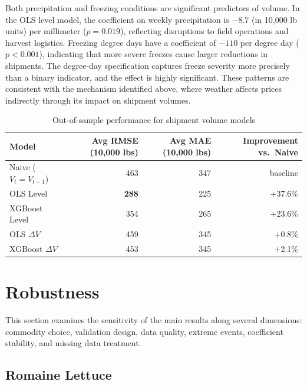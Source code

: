 \documentclass[12pt]{article}
\begin{document}
Both precipitation and freezing conditions are significant predictors of volume. In the OLS level model, the coefficient on weekly precipitation is $-8.7$ (in 10,000 lb units) per millimeter ($p = 0.019$), reflecting disruptions to field operations and harvest logistics. Freezing degree days have a coefficient of $-110$ per degree day ($p < 0.001$), indicating that more severe freezes cause larger reductions in shipments. The degree-day specification captures freeze severity more precisely than a binary indicator, and the effect is highly significant. These patterns are consistent with the mechanism identified above, where weather affects prices indirectly through its impact on shipment volumes.

\begin{table}[!htbp]
\centering
\caption{Out-of-sample performance for shipment volume models}
\label{tab:volume}
\begin{tabular}{lrrr}
\toprule
Model & Avg RMSE (10,000 lbs) & Avg MAE (10,000 lbs) & Improvement vs.\ Naive \\
\midrule
Naive ($V_t = V_{t-1}$) & 463 & 347 & baseline \\
OLS Level & \textbf{288} & 225 & +37.6\% \\
XGBoost Level & 354 & 265 & +23.6\% \\
OLS $\Delta V$ & 459 & 345 & +0.8\% \\
XGBoost $\Delta V$ & 453 & 345 & +2.1\% \\
\bottomrule
\end{tabular}
\end{table}

\section{Robustness}
\label{sec:robustness}

This section examines the sensitivity of the main results along several dimensions: commodity choice, validation design, data quality, extreme events, coefficient stability, and missing data treatment.

\subsection{Romaine Lettuce}
\label{subsec:romaine}
\end{document}
